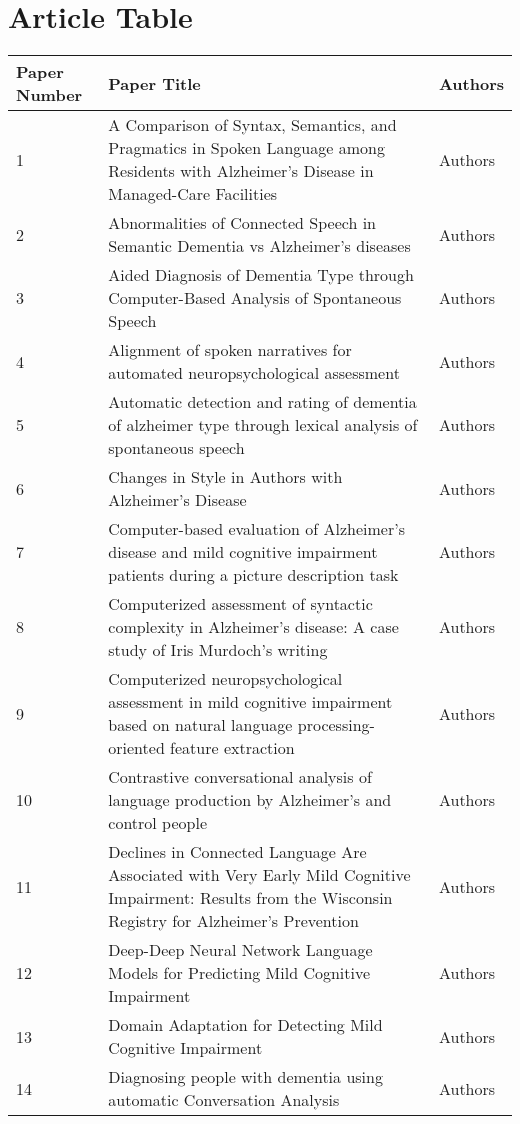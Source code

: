 \documentclass[12pt]{article}
\begin{document}
\section{Article Table}
\begin{longtable}{ p{1cm} | p{6cm} | p{6cm}}
	\hline
	Paper Number & Paper Title & Authors \\ \hline
	1 & A Comparison of Syntax, Semantics, and Pragmatics in Spoken Language among Residents with Alzheimer's Disease in Managed-Care Facilities & Authors \\ \hline
	2 & Abnormalities of Connected Speech in Semantic Dementia vs Alzheimer’s diseases & Authors \\ \hline
	3 & Aided Diagnosis of Dementia Type through Computer-Based Analysis of Spontaneous Speech & Authors \\ \hline
	4 & Alignment of spoken narratives for automated neuropsychological assessment & Authors \\ \hline
	5 & Automatic detection and rating of dementia of alzheimer type through lexical analysis of spontaneous speech & Authors \\ \hline
	6 & Changes in Style in Authors with Alzheimer’s Disease & Authors \\ \hline
	7 & Computer-based evaluation of Alzheimer's disease and mild cognitive impairment patients during a picture description task & Authors \\ \hline
	8 & Computerized assessment of syntactic complexity in Alzheimer's disease: A case study of Iris Murdoch's writing & Authors \\ \hline
	9 & Computerized neuropsychological assessment in mild cognitive impairment based on natural language processing-oriented feature extraction & Authors \\ \hline
	10 & Contrastive conversational analysis of language production by Alzheimer's and control people& Authors \\ \hline
	11 & Declines in Connected Language Are Associated with Very Early Mild Cognitive Impairment: Results from the Wisconsin Registry for Alzheimer’s Prevention & Authors \\ \hline
	12 & Deep-Deep Neural Network Language Models for Predicting Mild Cognitive Impairment & Authors \\ \hline
	13 & Domain Adaptation for Detecting Mild Cognitive Impairment & Authors \\ \hline
	14 & Diagnosing people with dementia using automatic Conversation Analysis & Authors \\ \hline

\end{longtable}
\end{document}
